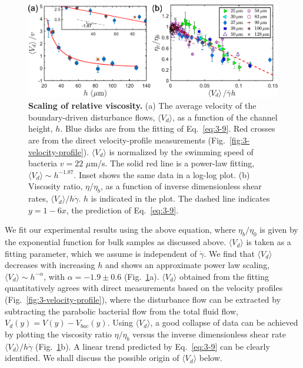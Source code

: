 \begin{figure}[!ht]
	\begin{center}
	\includegraphics[width=5.5 in]{Figs/3-Rheo/6.pdf}
	\end{center}
	\caption[Scaling of Relative Viscosity of Bacterial Suspensions]
	{
	\textbf{Scaling of relative viscosity.}
  (a) The average velocity of the boundary-driven disturbance flows, $\langle V_d \rangle$, as a function of the channel height, $h$. Blue disks are from the fitting of Eq.~\ref{eq:3-9}. Red crosses are from the direct velocity-profile measurements (Fig.~\ref{fig:3-velocity-profile}). $\langle V_d \rangle$ is normalized by the swimming speed of bacteria $v = 22$ $\mu$m/s. The solid red line is a power-law fitting, $\langle V_d \rangle \sim h^{-1.87}$. Inset shows the same data in a log-log plot.
  (b) Viscosity ratio, $\eta/\eta_b$, as a function of inverse dimensionless shear rates, $\langle V_d \rangle / h\dot\gamma$. $h$ is indicated in the plot. The dashed line indicates $y = 1 - 6x$, the prediction of Eq.~\ref{eq:3-9}.
  }
	\label{fig:3-scaling}
\end{figure}


We fit our experimental results using the above equation, where $\eta_b/\eta_0$ is given by the exponential function for bulk samples as discussed above. $\langle V_d \rangle$ is taken as a fitting parameter, which we assume is independent of $\dot\gamma$. We find that $\langle V_d \rangle$ decreases with increasing $h$ and shows an approximate power law scaling, $\langle V_d \rangle \sim h^{-\alpha}$, with $\alpha = - 1.9 \pm 0.6$ (Fig.~\ref{fig:3-scaling}a).
$\langle V_d \rangle$ obtained from the fitting quantitatively agrees with direct measurements based on the velocity profiles (Fig.~\ref{fig:3-velocity-profile}), where the disturbance flow can be extracted by subtracting the parabolic bacterial flow from the total fluid flow, $V_d(y) = V(y) - V_{bac}(y)$. Using $\langle V_d \rangle$, a good collapse of data can be achieved by plotting the viscosity ratio $\eta/\eta_b$ versus the inverse dimensionless shear rate $\langle V_d \rangle / h\dot\gamma$ (Fig.~\ref{fig:3-scaling}b).
A linear trend predicted by Eq.~\ref{eq:3-9} can be clearly identified. We shall discuss the possible origin of $\langle V_d \rangle$ below.

